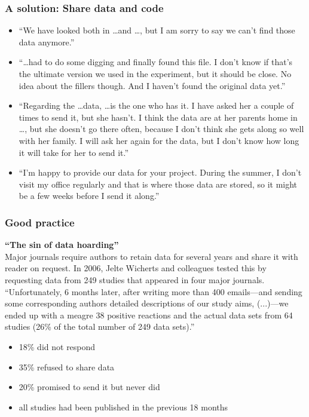 \documentclass{beamer}
\begin{document}
\begin{frame}
\frametitle{A solution: Share data and code}

 \begin{itemize}
 \item
 ``We have looked both in \dots and \dots, but I am sorry to say we can’t find those data anymore.''  \pause
 \item 
 ``\dots had to do some digging and finally found this file. I don’t know if that’s the ultimate version we used in the experiment, but it should be close. No idea about the fillers though. And I haven’t found the original data yet.'' \pause
 \item 
 ``Regarding the \dots data, \dots is the one who has it.  I have asked her a couple of times to send it, but she hasn't.  I think the data are at her parents home in \dots, but she doesn't go there often, because I don't think she gets along so well with her family.  I will ask her again for the data, but I don't know how long it will take for her to send it.''  \pause
 \item 
 ``I'm happy to provide our data for your project. During the summer, I don't visit my office regularly and that is where those data are stored, so it might be a few weeks before I send it along.''
 \end{itemize}
\end{frame}


\begin{frame}
\frametitle{Good practice}

 \textbf{``The sin of data hoarding''}\\[12pt]
 
 Major journals require authors to retain data for several years and share it with reader on request.
In 2006, Jelte Wicherts and colleagues tested this by requesting data from 249 studies that appeared in four major journals.\\[12pt]
 
 
 ``Unfortunately, 6 months later, after writing more than 400 emails---and sending some corresponding authors detailed descriptions of our study aims, (...)---we ended up with a meagre 38 positive reactions and the actual data sets from 64 studies (26\% of the total number of 249 data sets).''
 
 \begin{itemize}
 \item 18\% did not respond
 \item 35\% refused to share data
 \item 20\% promised to send it but never did
 \item all studies had been published in the previous 18 months
  \end{itemize}
  
 \end{frame}
\end{document}
